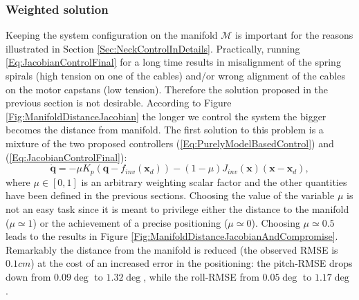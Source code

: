 \documentclass[conference]{IEEEtran}
\numberwithin{equation}{section}
\newcommand{\q}{\mathbf{q}}
\newcommand{\x}{\mathbf{x}}
\begin{document}
\subsubsection{Weighted solution} \label{Sec:WeightedSolution}

Keeping the system configuration on the manifold $\mathcal M$ is important for the reasons illustrated in Section \ref{Sec:NeckControlInDetails}.
Practically, running \eqref{Eq:JacobianControlFinal} for a long time results in misalignment of the spring spirals (high tension on one of the cables) and/or wrong alignment of the cables on the motor capstans (low tension). Therefore the solution proposed in the previous section is not desirable. According to Figure 
\ref{Fig:ManifoldDistanceJacobian} the longer we control the system the bigger becomes the distance from manifold. The first solution to this problem is a mixture of the two proposed controllers (\ref{Eq:PurelyModelBasedControl}) and (\ref{Eq:JacobianControlFinal}):
\begin{equation} \label{Eq:WeightedControl}
\dot{\q} = -\mu K_p(\q - f_{inv}(\x_d)) - (1-\mu) J_{inv}(\x) (\x - \x_d),
\end{equation}
where $\mu \in [0, 1]$ is an arbitrary weighting scalar factor and the other quantities have been defined in the previous sections. Choosing the value of the variable $\mu$ is not an easy task since it is meant to privilege either the distance to the manifold ($\mu \simeq 1$) or the achievement of a precise positioning ($\mu \simeq 0$). Choosing $\mu \simeq 0.5$ leads to the results in Figure \ref{Fig:ManifoldDistanceJacobianAndCompromise}. Remarkably the distance from the manifold is reduced (the observed RMSE is $0.1cm$) at the cost of an increased error in the positioning: the pitch-RMSE drops down from $0.09 \deg$ to $1.32 \deg$, while the roll-RMSE from $0.05 \deg$ to $1.17 \deg$.
\end{document}
